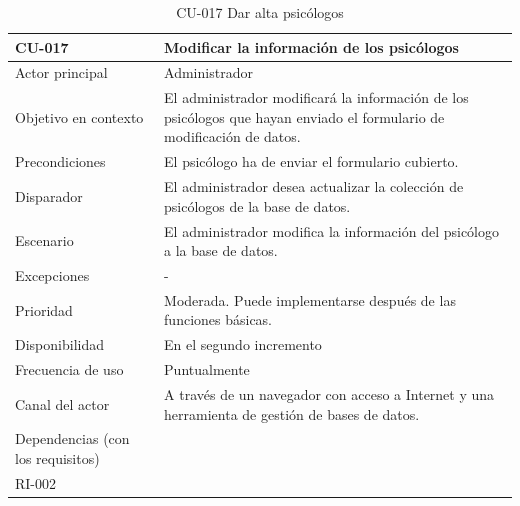\begin{table}[htpb]
\centering
\begin{tabularx}{\textwidth}{|X|X|}
\hline
\rowcolor[gray]{0.9}\textbf{CU-017}                            & \textbf{Modificar la información de los psicólogos                                                                           } \\ \hline
Actor principal                   & Administrador                                                                                  \\ \hline
Objetivo en contexto              & El administrador modificará la información de los psicólogos que hayan enviado el formulario de modificación de datos.    \\ \hline
Precondiciones                    & El psicólogo ha de enviar el formulario cubierto.          \\ \hline
Disparador                        & El administrador desea actualizar la colección de psicólogos de la base de datos.              \\ \hline
Escenario                         & El administrador modifica la información del psicólogo a la base de datos.                        \\ \hline
Excepciones                       & -                                                                                              \\ \hline
Prioridad                         & Moderada. Puede implementarse después de las funciones básicas.                                \\ \hline
Disponibilidad                    & En el segundo incremento                                                                       \\ \hline
Frecuencia de uso                 & Puntualmente                                                                                   \\ \hline
Canal del actor                   & A través de un navegador con acceso a Internet y una herramienta de gestión de bases de datos. \\ \hline
Dependencias (con los requisitos) & \begin{tabular}[c]{@{}l@{}}RI-003\\ RI-002\end{tabular}                                        \\ \hline
\end{tabularx}
\caption{CU-017 Dar alta psicólogos}                          
\end{table}

